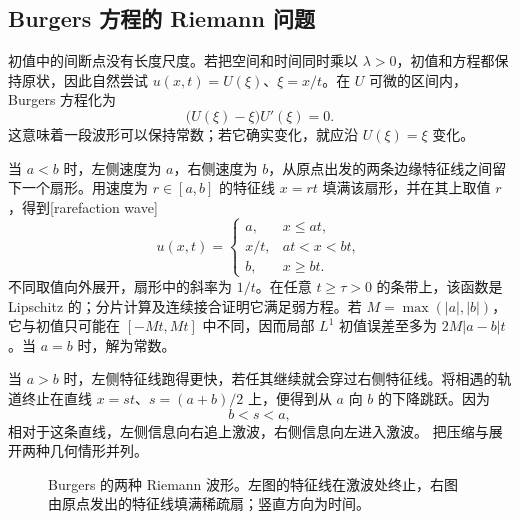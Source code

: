 \subsection{Burgers 方程的 Riemann 问题}
\label{b2:subsec:070502}

初值中的间断点没有长度尺度。若把空间和时间同时乘以 \(\lambda>0\)，初值和方程都保持原状，因此自然尝试
\(u(x,t)=U(\xi)\)、\(\xi=x/t\)。在 \(U\) 可微的区间内，Burgers 方程化为
\[
 \bigl(U(\xi)-\xi\bigr)U'(\xi)=0.
\]
这意味着一段波形可以保持常数；若它确实变化，就应沿 \(U(\xi)=\xi\) 变化。

当 \(a<b\) 时，左侧速度为 \(a\)，右侧速度为 \(b\)，从原点出发的两条边缘特征线之间留下一个扇形。用速度为 \(r\in[a,b]\) 的特征线 \(x=rt\) 填满该扇形，并在其上取值 \(r\)，得到[rarefaction wave]
\begin{equation}\label{b2:eq:07-burgers-rarefaction}
 u(x,t)=
 \begin{cases}
 a,&x\leq at,\\
 x/t,&at<x<bt,\\
 b,&x\geq bt.
 \end{cases}
\end{equation}
不同取值向外展开，扇形中的斜率为 \(1/t\)。在任意 \(t\geq\tau>0\) 的条带上，该函数是 Lipschitz 的；分片计算及连续接合证明它满足弱方程。若 \(M=\max(|a|,|b|)\)，它与初值只可能在 \([-Mt,Mt]\) 中不同，因而局部 \(L^1\) 初值误差至多为 \(2M|a-b|t\)。当 \(a=b\) 时，解为常数。

当 \(a>b\) 时，左侧特征线跑得更快，若任其继续就会穿过右侧特征线。将相遇的轨道终止在直线
\(x=st\)、\(s=(a+b)/2\) 上，便得到从 \(a\) 向 \(b\) 的下降跳跃。因为
\[
 b<s<a,
\]
相对于这条直线，左侧信息向右追上激波，右侧信息向左进入激波。
把压缩与展开两种几何情形并列。

\begin{figure}[htbp]
\centering
{}
\caption[Burgers 的两种 Riemann 波形]{Burgers 的两种 Riemann 波形。左图的特征线在激波处终止，右图由原点发出的特征线填满稀疏扇；竖直方向为时间。}
\label{b2:fig:07-riemann-waves}
\end{figure}

